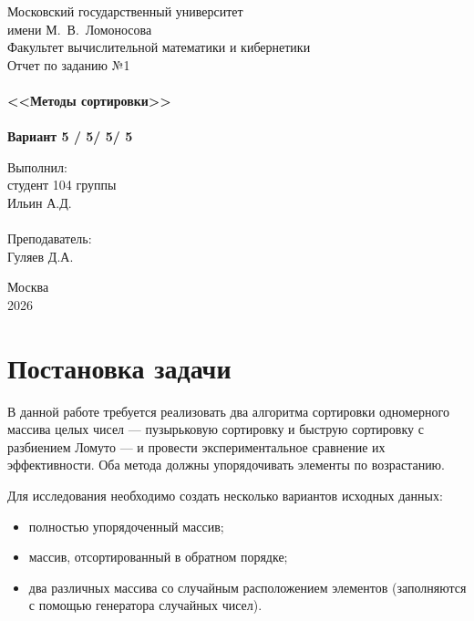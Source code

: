 \documentclass[a4paper,12pt,titlepage,finall]{article}
\begin{document}
\begin{titlepage}
    \begin{center}
	{\small \sc Московский государственный университет \\имени М.~В.~Ломоносова\\
	Факультет вычислительной математики и кибернетики\\}
	\vfill
	{\Large \sc Отчет по заданию №1}\\
	~\\
	{\large \bf <<Методы сортировки>>}\\ 
	~\\
	{\large \bf Вариант 5 / 5/ 5/ 5}
    \end{center}
    \begin{flushright}
	\vfill {Выполнил:\\
	студент 104 группы\\
	Ильин А.Д.\\
	~\\
	Преподаватель:\\
	Гуляев Д.А.}
    \end{flushright}
    \begin{center}
	\vfill
	{\small Москва\\2026}
    \end{center}
\end{titlepage}

\tableofcontents
\newpage

\section{Постановка задачи}

В данной работе требуется реализовать два алгоритма сортировки одномерного массива целых чисел — пузырьковую сортировку и быструю сортировку с разбиением Ломуто — и провести экспериментальное сравнение их эффективности. Оба метода должны упорядочивать элементы по возрастанию.

Для исследования необходимо создать несколько вариантов исходных данных:
\begin{itemize}
\item полностью упорядоченный массив;
\item массив, отсортированный в обратном порядке;
\item два различных массива со случайным расположением элементов (заполняются с помощью генератора случайных чисел).
\end{itemize}
\end{document}
